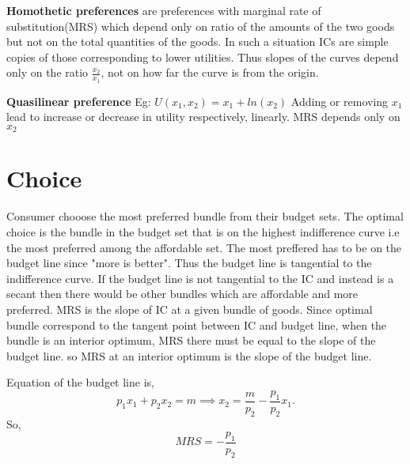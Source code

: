 \documentclass{tufte-handout}
\begin{document}
\vspace{0.5cm}

\textbf{Homothetic preferences} are preferences with marginal rate of substitution(MRS) which depend only on ratio of the amounts of the two goods but  not on the total quantities of the goods. In such a situation ICs are simple copies of those corresponding to lower utilities. Thus slopes of the curves depend only on the ratio $ \frac{x_2}{x_1}$, not on how far the curve is from the origin.






\textbf{Quasilinear preference} Eg: $U(x_1,x_2) = x_1 + ln(x_2)$ Adding or removing $x_1$ lead to increase or decrease in utility respectively, linearly. MRS depends only on $x_2$


\section*{Choice}

Consumer chooose the most preferred bundle from their budget sets. The optimal choice is the bundle in the budget set that is on the highest indifference curve i.e the most preferred among the affordable set. The most preffered has to be on the budget line since "more is better". Thus the budget line is tangential to the indifference curve. If the budget line is not tangential to the IC and instead is a secant then there would be other bundles which are affordable and more preferred. MRS is the slope of IC at a given bundle of goods. Since optimal bundle correspond to the tangent point between IC and budget line, when the bundle is an interior optimum, MRS there must be equal to the slope of the budget line. so MRS at an interior optimum is the slope of the budget line.

Equation of the budget line is,
\[
p_1x_1 + p_2x_2 = m \implies x_2 = \frac{m}{p_2} - \frac{p_1}{p_2}x_1
.\] 
So, $$MRS = -\frac{p_1}{p_2}$$
\end{document}

